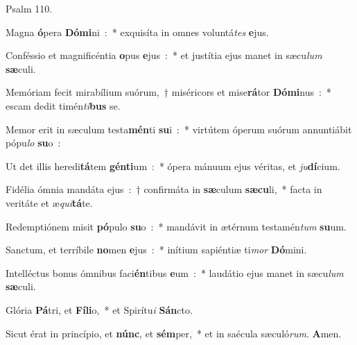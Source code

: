 \documentclass[letterpaper,12pt]{article} %
\let\oldheadrulewidth\headrulewidth
\renewcommand\headrulewidth{0pt}
\begin{document}
\renewcommand\headrulewidth{\oldheadrulewidth}

\large
{}
\vspace{-3ex}
\begin{center}{\Large Psalm 110.}\end{center}
\normalsize

\begin{multicols}{2}
\begin{psalmverses}[1]
\item Magna\textbf{ ó}pera\textbf{ Dó}\textbf{mi}ni~:~* exquisíta in omnes voluntá\emph{tes}\textbf{ e}jus.
\item Conféssio et magnificéntia\textbf{ o}pus\textbf{ e}jus~:~* et justítia ejus manet in sæcu\emph{lum}\textbf{ sæ}culi.
\item Memóriam fecit mirabílium suórum,~† miséricors et mise\textbf{rá}tor\textbf{ Dó}\textbf{mi}nus~:~* escam dedit timén\emph{ti}\textbf{bus} se.
\item Memor erit in sæculum testa\textbf{mén}ti\textbf{ su}i~:~* virtútem óperum suórum annuntiábit pópu\emph{lo}\textbf{ su}o~:
\item Ut det illis heredi\textbf{tá}tem\textbf{ gén}\textbf{ti}um~:~* ópera mánuum ejus véritas, et\emph{ ju}\textbf{dí}cium.
\item Fidélia ómnia mandáta ejus~:~† confirmáta in\textbf{ sæ}culum\textbf{ sæ}\textbf{cu}li,~* facta in veritáte et æ\emph{qui}\textbf{tá}te.
\item Redemptiónem misit\textbf{ pó}pulo\textbf{ su}o~:~* mandávit in ætérnum testamén\emph{tum}\textbf{ su}um.
\item Sanctum, et terríbile\textbf{ no}men\textbf{ e}jus~:~* inítium sapiéntiæ ti\emph{mor}\textbf{ Dó}mini.
\item Intelléctus bonus ómnibus faci\textbf{én}tibus\textbf{ e}um~:~* laudátio ejus manet in sæcu\emph{lum}\textbf{ sæ}culi.
\item Glória\textbf{ Pá}tri, et\textbf{ Fí}\textbf{li}o,~* et Spirítu\emph{i}\textbf{ Sán}cto.
\item Sicut érat in princípio, et\textbf{ núnc}, et\textbf{ sém}per,~* et in saécula sæculó\emph{rum}.\textbf{ A}men.\end{psalmverses}
\columnbreak
{}

\end{multicols}
\end{document}
